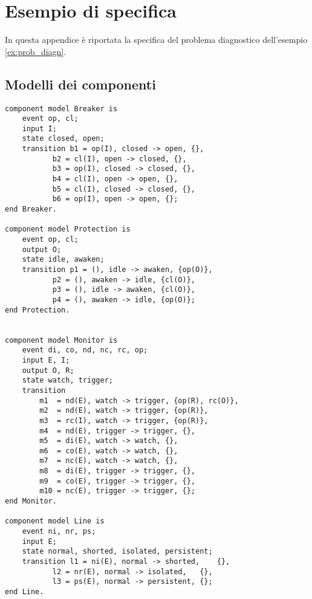 \chapter{Esempio di specifica} \label{spec_ex}
In questa appendice è riportata la specifica del problema diagnostico dell'esempio \ref{ex:prob_diagn}.

\section{Modelli dei componenti}
\begin{lstlisting}
component model Breaker is
	event op, cl;
	input I;
	state closed, open;
	transition b1 = op(I), closed -> open, {},
		   b2 = cl(I), open -> closed, {},
	 	   b3 = op(I), closed -> closed, {},
		   b4 = cl(I), open -> open, {},
		   b5 = cl(I), closed -> closed, {},
		   b6 = op(I), open -> open, {};
end Breaker.

component model Protection is
	event op, cl;
	output O;
	state idle, awaken;
	transition p1 = (), idle -> awaken, {op(O)},
		   p2 = (), awaken -> idle, {cl(O)},
		   p3 = (), idle -> awaken, {cl(O)},
		   p4 = (), awaken -> idle, {op(O)};
end Protection.


component model Monitor is
	event di, co, nd, nc, rc, op;
	input E, I;	
	output O, R;
	state watch, trigger;
	transition 
		m1  = nd(E), watch -> trigger, {op(R), rc(O)},
		m2  = nd(E), watch -> trigger, {op(R)},
		m3  = rc(I), watch -> trigger, {op(R)},
		m4  = nd(E), trigger -> trigger, {},
		m5  = di(E), watch -> watch, {},
		m6  = co(E), watch -> watch, {},
		m7  = nc(E), watch -> watch, {},
		m8  = di(E), trigger -> trigger, {},
		m9  = co(E), trigger -> trigger, {},
		m10 = nc(E), trigger -> trigger, {};
end Monitor.

component model Line is
	event ni, nr, ps;
	input E;
	state normal, shorted, isolated, persistent;
	transition l1 = ni(E), normal -> shorted,    {},
		   l2 = nr(E), normal -> isolated,   {},
		   l3 = ps(E), normal -> persistent, {};
end Line.
\end{lstlisting}

